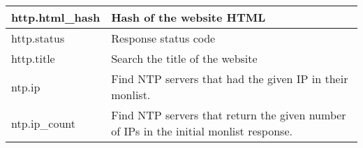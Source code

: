 \begin{table}[H]
{\begin{tabular}{|l|l|}
\hline
http.html\_hash                                                                 & Hash of the website HTML                                                                                                                                                                                                                                                                                                                                                    \\ 
\hline
http.status                                                                     & Response status code                                                                                                                                                                                                                                                                                                                                                        \\ 
\hline
http.title                                                                      & Search the title of the website                                                                                                                                                                                                                                                                                                                                             \\ 
\hline
ntp.ip                                                                          & Find NTP servers that had the given IP in their monlist.                                                                                                                                                                                                                                                                                                                    \\ 
\hline
ntp.ip\_count                                                                   & Find NTP servers that return the given number of IPs in the initial monlist response.                                                                                                                                                                                                                                                                                       \\ 
\hline


\end{tabular}}
\end{table}
